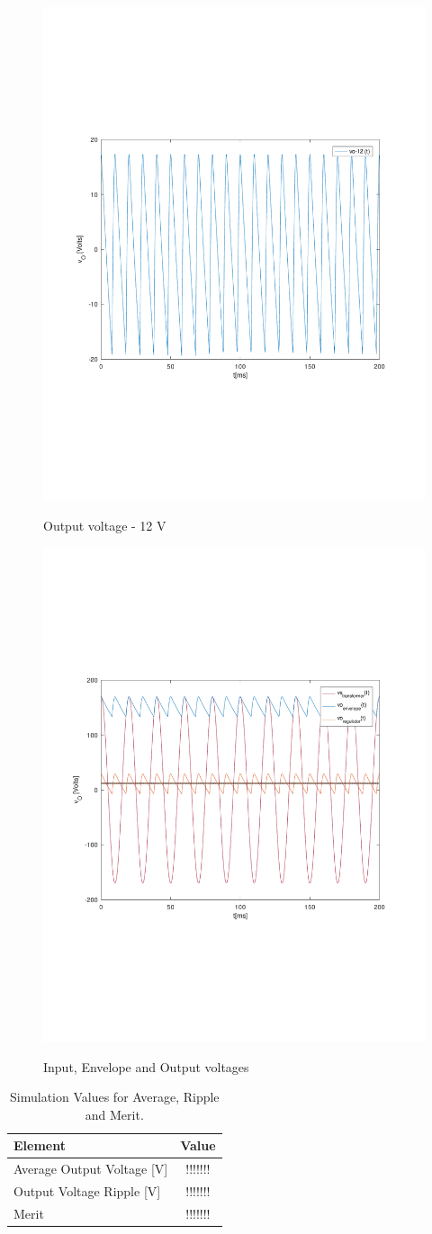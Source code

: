 \begin{figure}[!ht] \centering
\caption{Output voltage - 12 V}
\includegraphics[width=0.6\linewidth]{deviation.pdf}
\label{fig:gteo3}
\end{figure}
\newpage

\begin{figure}[!ht] \centering
\caption{Input, Envelope and Output voltages}
\includegraphics[width=0.6\linewidth]{all_vout.pdf}
\label{fig:gteo4}
\end{figure}
\newpage

\begin{table}[h]
    \centering
    \begin{tabular}{|l|c|}
    \hline
    {\bf Element } & {\bf Value } \\
    \hline \hline
    Average Output Voltage [V] & !!!!!!! \\   %
    \hline
    Output Voltage Ripple [V] & !!!!!!! \\
    \hline
    Merit & !!!!!!! \\  %
    \hline
    \end{tabular}
    \caption{Simulation Values for Average, Ripple and Merit.}
    \label{tab:teotab1}
\end{table}

\newpage 

\newpage 




